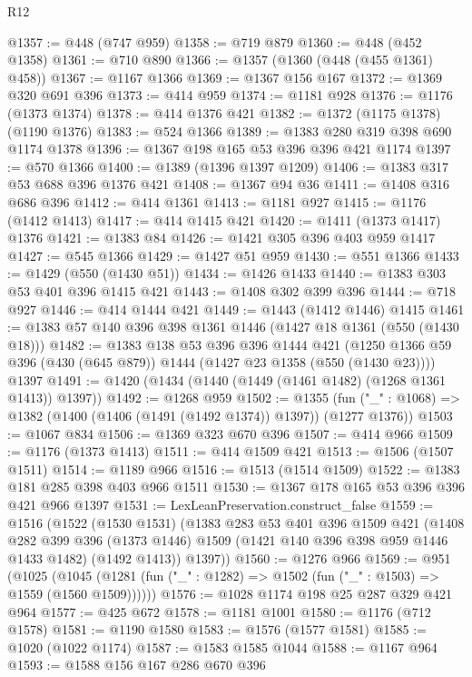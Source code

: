 \begin{lexlean}{R12}
\begin{coremodule}
@1357 := @448 (@747 @959)
@1358 := @719 @879
@1360 := @448 (@452 @1358)
@1361 := @710 @890
@1366 := @1357 (@1360 (@448 (@455 @1361) @458))
@1367 := @1167 @1366
@1369 := @1367 @156 @167
@1372 := @1369 @320 @691 @396
@1373 := @414 @959
@1374 := @1181 @928
@1376 := @1176 (@1373 @1374)
@1378 := @414 @1376 @421
@1382 := @1372 (@1175 @1378) (@1190 @1376)
@1383 := @524 @1366
@1389 := @1383 @280 @319 @398 @690 @1174 @1378
@1396 := @1367 @198 @165 @53 @396 @396 @421 @1174
@1397 := @570 @1366
@1400 := @1389 (@1396 @1397 @1209)
@1406 := @1383 @317 @53 @688 @396 @1376 @421
@1408 := @1367 @94 @36
@1411 := @1408 @316 @686 @396
@1412 := @414 @1361
@1413 := @1181 @927
@1415 := @1176 (@1412 @1413)
@1417 := @414 @1415 @421
@1420 := @1411 (@1373 @1417) @1376
@1421 := @1383 @84
@1426 := @1421 @305 @396 @403 @959 @1417
@1427 := @545 @1366
@1429 := @1427 @51 @959
@1430 := @551 @1366
@1433 := @1429 (@550 (@1430 @51))
@1434 := @1426 @1433
@1440 := @1383 @303 @53 @401 @396 @1415 @421
@1443 := @1408 @302 @399 @396
@1444 := @718 @927
@1446 := @414 @1444 @421
@1449 := @1443 (@1412 @1446) @1415
@1461 := @1383 @57 @140 @396 @398 @1361 @1446 (@1427 @18 @1361 (@550 (@1430 @18)))
@1482 := @1383
    @138
    @53
    @396
    @396
    @1444
    @421
    (@1250 @1366 @59 @396 (@430 (@645 @879)) @1444 (@1427 @23 @1358 (@550 (@1430 @23))))
    @1397
@1491 := @1420 (@1434 (@1440 (@1449 (@1461 @1482) (@1268 @1361 @1413)) @1397))
@1492 := @1268 @959
@1502 := @1355
    (fun ("_" : @1068) => @1382 (@1400 (@1406 (@1491 (@1492 @1374)) @1397)) (@1277 @1376))
@1503 := @1067 @834
@1506 := @1369 @323 @670 @396
@1507 := @414 @966
@1509 := @1176 (@1373 @1413)
@1511 := @414 @1509 @421
@1513 := @1506 (@1507 @1511)
@1514 := @1189 @966
@1516 := @1513 (@1514 @1509)
@1522 := @1383 @181 @285 @398 @403 @966 @1511
@1530 := @1367 @178 @165 @53 @396 @396 @421 @966 @1397
@1531 := LexLeanPreservation.construct_false
@1559 := @1516
    (@1522
      (@1530 @1531)
      (@1383
        @283
        @53
        @401
        @396
        @1509
        @421
        (@1408
          @282
          @399
          @396
          (@1373 @1446)
          @1509
          (@1421 @140 @396 @398 @959 @1446 @1433 @1482)
          (@1492 @1413))
        @1397))
@1560 := @1276 @966
@1569 := @951
    (@1025 (@1045 (@1281 (fun ("_" : @1282) => @1502 (fun ("_" : @1503) => @1559 (@1560 @1509))))))
@1576 := @1028 @1174 @198 @25 @287 @329 @421 @964
@1577 := @425 @672
@1578 := @1181 @1001
@1580 := @1176 (@712 @1578)
@1581 := @1190 @1580
@1583 := @1576 (@1577 @1581)
@1585 := @1020 (@1022 @1174)
@1587 := @1583 @1585 @1044
@1588 := @1167 @964
@1593 := @1588 @156 @167 @286 @670 @396

\end{coremodule}
\end{lexlean}
